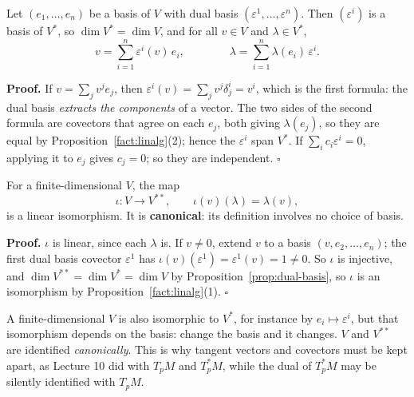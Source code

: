 \documentclass[11pt]{report}
\makeatletter
\newcounter{thmcounter}[section]
\renewenvironment{proof}[1][Proof]{\noindent\textbf{#1.} }{\hfill$\square$\par\vspace{5pt}}
\newcommand{\thmlabel}[1]{\edef\@currentlabel{\arabic{section}.\arabic{thmcounter}}\label{#1}}
\newcommand{\leeref}[1]{\par\smallskip{\raggedleft\footnotesize\textsc{Lee}:\ #1\par}}
\makeatother
\begin{document}
\begin{propbox}\thmlabel{prop:dual-basis}
Let $(e_1, \ldots, e_n)$ be a basis of $V$ with dual basis $(\varepsilon^1, \ldots, \varepsilon^n)$. Then $(\varepsilon^i)$ is a basis of $V^*$, so $\dim V^* = \dim V$, and for all $v \in V$ and $\lambda \in V^*$,
\[
v = \sum_{i=1}^n \varepsilon^i(v)\, e_i, \qquad\qquad \lambda = \sum_{i=1}^n \lambda(e_i)\, \varepsilon^i .
\]
\leeref{Proposition 11.1}
\end{propbox}

\begin{proof}
If $v = \sum_j v^j e_j$, then $\varepsilon^i(v) = \sum_j v^j \delta^i_j = v^i$, which is the first formula: the dual basis \emph{extracts the components} of a vector. The two sides of the second formula are covectors that agree on each $e_j$, both giving $\lambda(e_j)$, so they are equal by Proposition~\ref{fact:linalg}(2); hence the $\varepsilon^i$ span $V^*$. If $\sum_i c_i \varepsilon^i = 0$, applying it to $e_j$ gives $c_j = 0$; so they are independent.
\end{proof}

\begin{propbox}\thmlabel{prop:double-dual}
For a finite-dimensional $V$, the map
\[
\iota : V \to V^{**}, \qquad \iota(v)(\lambda) = \lambda(v),
\]
is a linear isomorphism. It is \textbf{canonical}: its definition involves no choice of basis.
\leeref{Proposition 11.8}
\end{propbox}

\begin{proof}
$\iota$ is linear, since each $\lambda$ is. If $v \ne 0$, extend $v$ to a basis $(v, e_2, \ldots, e_n)$; the first dual basis covector $\varepsilon^1$ has $\iota(v)(\varepsilon^1) = \varepsilon^1(v) = 1 \ne 0$. So $\iota$ is injective, and $\dim V^{**} = \dim V^* = \dim V$ by Proposition~\ref{prop:dual-basis}, so $\iota$ is an isomorphism by Proposition~\ref{fact:linalg}(1).
\end{proof}

\begin{rembox}\label{rem:vector-spaces}
A finite-dimensional $V$ is also isomorphic to $V^*$, for instance by $e_i \mapsto \varepsilon^i$, but that isomorphism depends on the basis: change the basis and it changes. $V$ and $V^{**}$ are identified \emph{canonically}. This is why tangent vectors and covectors must be kept apart, as Lecture 10 did with $T_pM$ and $T_p^*M$, while the dual of $T_p^*M$ may be silently identified with $T_pM$.
\end{rembox}
\end{document}
